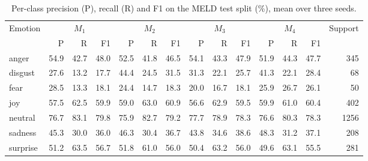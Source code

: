\begin{table}[t]
\centering
\caption{Per-class precision (P), recall (R) and F1 on the MELD test split (\%), mean over three seeds.}
\label{tab:perclass}
\small
\begin{tabular}{lrrrrrrrrrrrrr}
\toprule
Emotion & \multicolumn{3}{c}{$M_1$} & \multicolumn{3}{c}{$M_2$} & \multicolumn{3}{c}{$M_3$} & \multicolumn{3}{c}{$M_4$} & Support \\
\cmidrule(lr){2-4} \cmidrule(lr){5-7} \cmidrule(lr){8-10} \cmidrule(lr){11-13}
 & P & R & F1 & P & R & F1 & P & R & F1 & P & R & F1 & \\
\midrule
anger & 54.9 & 42.7 & 48.0 & 52.5 & 41.8 & 46.5 & 54.1 & 43.3 & 47.9 & 51.9 & 44.3 & 47.7 & 345 \\
disgust & 27.6 & 13.2 & 17.7 & 44.4 & 24.5 & 31.5 & 31.3 & 22.1 & 25.7 & 41.3 & 22.1 & 28.4 & 68 \\
fear & 28.5 & 13.3 & 18.1 & 24.4 & 14.7 & 18.3 & 20.0 & 16.7 & 18.1 & 25.9 & 26.7 & 26.1 & 50 \\
joy & 57.5 & 62.5 & 59.9 & 59.0 & 63.0 & 60.9 & 56.6 & 62.9 & 59.5 & 59.9 & 61.0 & 60.4 & 402 \\
neutral & 76.7 & 83.1 & 79.8 & 75.9 & 82.7 & 79.2 & 77.7 & 78.9 & 78.3 & 76.6 & 80.3 & 78.3 & 1256 \\
sadness & 45.3 & 30.0 & 36.0 & 46.3 & 30.4 & 36.7 & 43.8 & 34.6 & 38.6 & 48.3 & 31.2 & 37.1 & 208 \\
surprise & 51.2 & 63.5 & 56.7 & 51.8 & 61.0 & 56.0 & 50.4 & 63.2 & 56.0 & 49.6 & 63.1 & 55.5 & 281 \\
\bottomrule
\end{tabular}
\end{table}